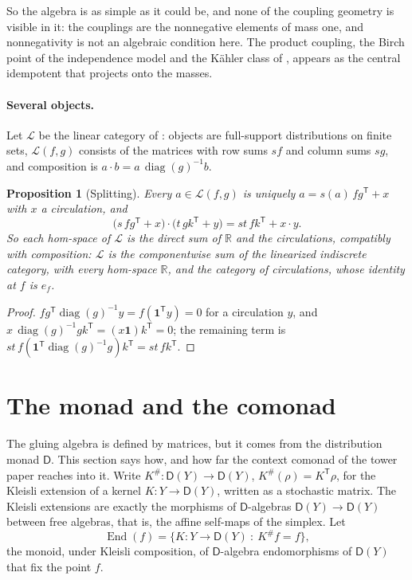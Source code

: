 \documentclass[11pt]{article}
\newtheorem{proposition}[theorem]{Proposition}
\theoremstyle{definition}
\theoremstyle{remark}
\newcommand{\D}{\mathsf{D}}
\newcommand{\R}{\mathbb{R}}
\newcommand{\diag}{\operatorname{diag}}
\newcommand{\T}{\mathsf T}
\begin{document}
So the algebra is as simple as it could be, and none of the coupling geometry is visible in it: the couplings are the
nonnegative elements of mass one, and nonnegativity is not an algebraic condition here. The product coupling, the
Birch point of the independence model and the Kähler class of \cite[\S6]{Conditionals}, appears as the central idempotent
that projects onto the masses.

\paragraph{Several objects.} Let $\mathcal L$ be the linear category of \cite[Def.~10.1]{Conditionals}: objects are
full-support distributions on finite sets, $\mathcal L(f,g)$ consists of the matrices with row sums $sf$ and column sums
$sg$, and composition is $a\cdot b=a\,\diag(g)^{-1}b$.

\begin{proposition}[Splitting]\label{prop:split}
Every $a\in\mathcal L(f,g)$ is uniquely $a=s(a)\,fg^\T+x$ with $x$ a circulation, and
\[
\bigl(s\,fg^\T+x\bigr)\cdot\bigl(t\,gk^\T+y\bigr)=st\,fk^\T+x\cdot y .
\]
So each hom-space of $\mathcal L$ is the direct sum of $\R$ and the circulations, compatibly with composition: $\mathcal L$ is the
componentwise sum of the linearized indiscrete category, with every hom-space $\R$, and the category of circulations,
whose identity at $f$ is $e_f$.
\end{proposition}
\begin{proof}
$fg^\T\diag(g)^{-1}y=f(\mathbf 1^\T y)=0$ for a circulation $y$, and $x\,\diag(g)^{-1}gk^\T=(x\mathbf 1)k^\T=0$; the remaining term is
$st\,f(\mathbf 1^\T\diag(g)^{-1}g)k^\T=st\,fk^\T$.
\end{proof}

\section{The monad and the comonad}\label{sec:monad}

The gluing algebra is defined by matrices, but it comes from the distribution monad $\D$. This section says how, and
how far the context comonad of the tower paper \cite{Tower} reaches into it. Write $K^\#\colon\D(Y)\to\D(Y)$,
$K^\#(\rho)=K^\T\rho$, for the Kleisli extension of a kernel $K\colon Y\to\D(Y)$, written as a stochastic matrix. The Kleisli
extensions are exactly the morphisms of $\D$-algebras $\D(Y)\to\D(Y)$ between free algebras, that is, the affine self-maps of
the simplex. Let
\[
\operatorname{End}(f)=\{K\colon Y\to\D(Y)\ :\ K^\#f=f\},
\]
the monoid, under Kleisli composition, of $\D$-algebra endomorphisms of $\D(Y)$ that fix the point $f$.
\end{document}
